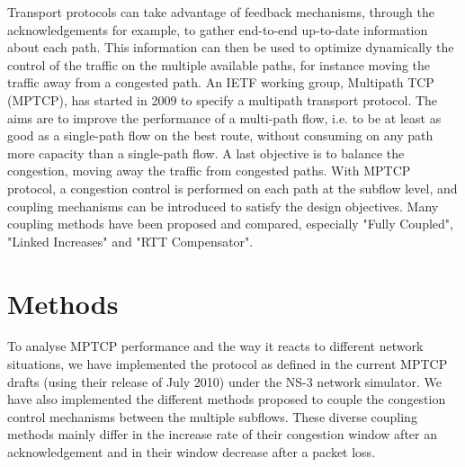 \documentclass[10pt,a4paper]{article}
\begin{document}
Transport protocols can take advantage of feedback mechanisms, through the acknowledgements for example, to gather end-to-end up-to-date information about each path. This information can then be used to optimize dynamically the control of the traffic on the multiple available paths,  for instance moving the traffic away from a congested path. An IETF working group, Multipath TCP (MPTCP), has started in 2009 to specify a multipath transport protocol. The aims are to improve the performance of a multi-path flow, i.e. to be at least as good as a single-path flow on the best route, without consuming on any path more capacity than a single-path flow. A last objective is to balance the congestion, moving away the traffic from congested paths.  
With MPTCP protocol, a congestion control is performed on each path at the subflow level, and coupling mechanisms can be introduced to satisfy the design objectives. Many coupling methods have been proposed and compared, especially "Fully Coupled", "Linked Increases" and "RTT Compensator".


\section{Methods}
To analyse MPTCP performance and the way it reacts to different network situations, we have implemented the protocol as defined in the current MPTCP drafts (using their release of July 2010) under the NS-3 network simulator. We have also implemented the different methods proposed to couple the congestion control mechanisms between the multiple subflows. These diverse coupling methods mainly differ in the increase rate of their congestion window after an acknowledgement and in their window decrease after a packet loss.
\end{document}

